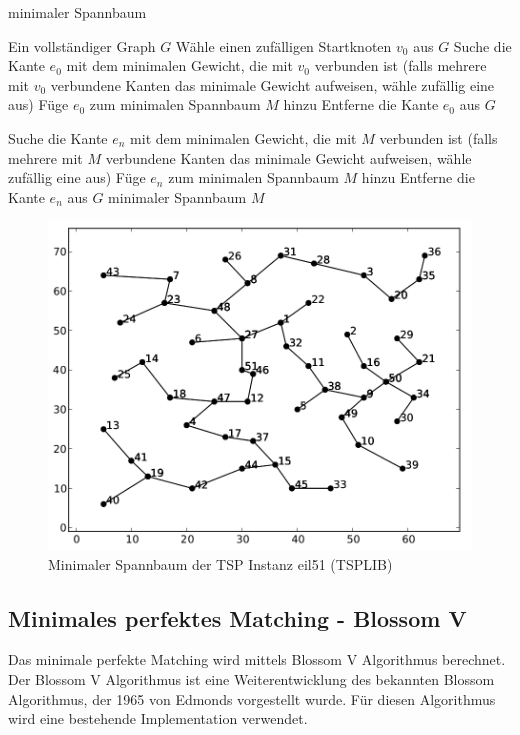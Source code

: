 \documentclass[11pt,a4paper]{article}
\begin{document}
\begin{algorithm}[H]
    \renewcommand{\algorithmicrequire}{\textbf{Eingabe:}}
    \renewcommand{\algorithmicensure}{\textbf{Ausgabe:}}
    \caption{minimaler Spannbaum}

    \begin{algorithmic}[1]
    \REQUIRE Ein vollständiger Graph $G$
        \STATE Wähle einen zufälligen Startknoten $v_0$ aus $G$
        \STATE Suche die Kante $e_0$ mit dem minimalen Gewicht, die mit $v_0$ verbunden ist (falls mehrere mit $v_0$ verbundene Kanten das minimale Gewicht aufweisen, wähle zufällig eine aus)
        \STATE Füge $e_0$ zum minimalen Spannbaum $M$ hinzu
        \STATE Entferne die Kante $e_0$ aus $G$

            \STATE Suche die Kante $e_n$ mit dem minimalen Gewicht, die mit $M$ verbunden ist (falls mehrere mit $M$ verbundene Kanten das minimale Gewicht aufweisen, wähle zufällig eine aus)
            \STATE Füge $e_n$ zum minimalen Spannbaum $M$ hinzu
            \STATE Entferne die Kante $e_n$ aus $G$
        \ENDWHILE
    \ENSURE minimaler Spannbaum $M$
    \end{algorithmic}
\end{algorithm}

\begin{figure}[H]
        \centering
        \includegraphics[width=12cm]{gfx/eil51_mst}
        \caption{Minimaler Spannbaum der TSP Instanz eil51 (TSPLIB)}
        \label{img:eil51_mst}
\end{figure}

\newpage

\subsection{Minimales perfektes Matching - Blossom V}
Das minimale perfekte Matching wird mittels Blossom V Algorithmus berechnet. Der Blossom V Algorithmus ist eine Weiterentwicklung des bekannten Blossom Algorithmus, der 1965 von Edmonds vorgestellt wurde.
Für diesen Algorithmus wird eine bestehende Implementation verwendet. 
\end{document}
